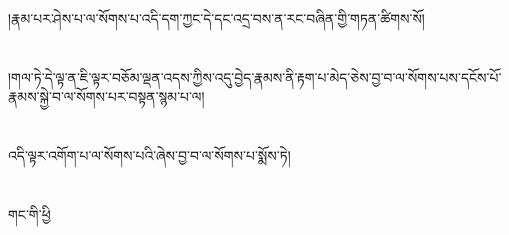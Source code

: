 །རྣམ་པར་ཤེས་པ་ལ་སོགས་པ་འདི་དག་ཀྱང་དེ་དང་འདྲ་བས་ན་རང་བཞིན་གྱི་གཏན་ཚིགས་སོ།\chapter{ }།གལ་ཏེ་དེ་ལྟ་ན་ཇི་ལྟར་བཅོམ་ལྡན་འདས་ཀྱིས་འདུ་བྱེད་རྣམས་ནི་རྟག་པ་མེད་ཅེས་བྱ་བ་ལ་སོགས་པས་དངོས་པོ་རྣམས་སྐྱེ་བ་ལ་སོགས་པར་བསྟན་སྙམ་པ་ལ།\chapter{ }འདི་ལྟར་འགོག་པ་ལ་སོགས་པའི་ཞེས་བྱ་བ་ལ་སོགས་པ་སྨོས་ཏེ།\chapter{ }གང་གི་ཕྱི